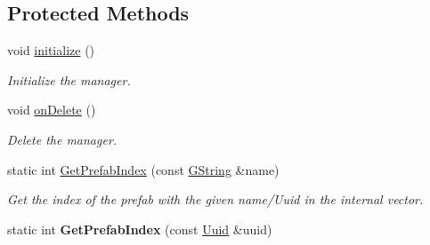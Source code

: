 \subsection*{Protected Methods}
\begin{DoxyCompactItemize}
\item 
\mbox{\label{classrev_1_1_physics_manager_ad08e061216d5c6fda062370b7897b3b5}} 
void \mbox{\hyperlink{classrev_1_1_physics_manager_ad08e061216d5c6fda062370b7897b3b5}{initialize}} ()
\begin{DoxyCompactList}\small\item\em Initialize the manager. \end{DoxyCompactList}\item 
\mbox{\label{classrev_1_1_physics_manager_a1c074c76384d28208593bfe3572279b5}} 
void \mbox{\hyperlink{classrev_1_1_physics_manager_a1c074c76384d28208593bfe3572279b5}{on\+Delete}} ()
\begin{DoxyCompactList}\small\item\em Delete the manager. \end{DoxyCompactList}\item 
static int \mbox{\hyperlink{classrev_1_1_physics_manager_a8be417f082121367094ca9c5b6fc92a7}{Get\+Prefab\+Index}} (const \mbox{\hyperlink{classrev_1_1_g_string}{G\+String}} \&name)
\begin{DoxyCompactList}\small\item\em Get the index of the prefab with the given name/\+Uuid in the internal vector. \end{DoxyCompactList}\item 
\mbox{\label{classrev_1_1_physics_manager_aafd2a3f17632a80df8a5d6cf1d15bf98}} 
static int {\bfseries Get\+Prefab\+Index} (const \mbox{\hyperlink{classrev_1_1_uuid}{Uuid}} \&uuid)
\end{DoxyCompactItemize}
